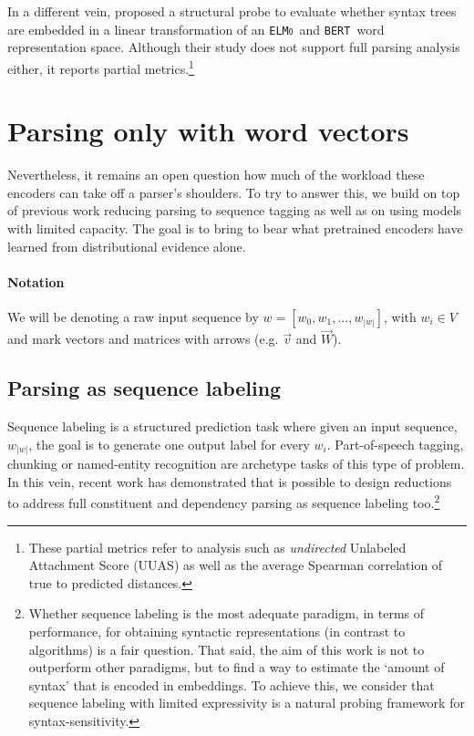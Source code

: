 \documentclass[letterpaper]{article} %
\newcommand{\citet}[1]{\citeauthor{#1} \shortcite{#1}}
\newcommand{\elmo}{\texttt{\textsc{ELMo}}}
\newcommand{\bert}{\texttt{\textsc{BERT}}}
\begin{document}
In a different vein, \citet{hewitt2019structural} proposed a structural probe to evaluate whether syntax trees are embedded in a linear transformation of an \elmo\ and \bert\ word representation space. Although their study does not support full parsing analysis either, it reports partial metrics.\footnote{These partial metrics refer to analysis such as \emph{undirected} Unlabeled Attachment Score (UUAS) as well as the average Spearman correlation of true to predicted distances.}


\section{Parsing only with word vectors}

Nevertheless, it remains an open question how much of the workload these encoders can take off a parser's shoulders. To try to answer this, we build on top of previous work reducing parsing to sequence tagging as well as on using models with limited capacity. The goal is to bring to bear what pretrained encoders have learned from distributional evidence alone.

\paragraph{Notation} We will be denoting a raw input sequence by $w=[w_0,w_1,...,w_{|w|}]$, with $w_i \in V$ and mark vectors and matrices with arrows (e.g. $\vec{v}$ and $\vec{W}$).

\subsection{Parsing as sequence labeling}

Sequence labeling is a structured prediction task where given an input sequence, $w_{|w|}$, the goal is to generate one output label for every $w_i$. Part-of-speech tagging, chunking or named-entity recognition are archetype tasks of this type of problem. In this vein, recent work has demonstrated that is possible to design reductions to address full constituent and dependency parsing as sequence labeling too.\footnote{Whether sequence labeling is the most adequate paradigm, in terms of performance, for obtaining syntactic representations (in contrast to algorithms) is a fair question. That said, the aim of this work is not to outperform other paradigms, but to find a way 
to estimate the `amount of syntax' that is encoded in embeddings. To achieve this, we consider that sequence labeling with limited expressivity is a natural probing framework for syntax-sensitivity.}
\end{document}
